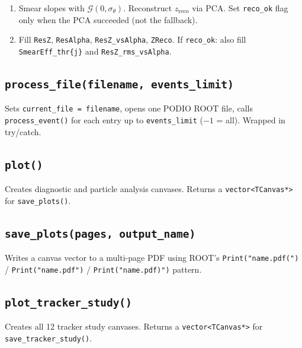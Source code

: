 \documentclass[11pt]{article}
\begin{document}
\begin{enumerate}
\begin{enumerate}
                Fill analytical histograms.
          \item Smear slopes with $\mathcal{G}(0, \sigma_\theta)$.
                Reconstruct $z_\text{reco}$ via PCA. Set \texttt{reco\_ok}
                flag only when the PCA succeeded (not the fallback).
          \item Fill \texttt{ResZ}, \texttt{ResAlpha}, \texttt{ResZ\_vsAlpha},
                \texttt{ZReco}. If \texttt{reco\_ok}: also fill
                \texttt{SmearEff\_thr\{j\}} and \texttt{ResZ\_rms\_vsAlpha}.
        \end{enumerate}
\end{enumerate}

\subsection{\texttt{process\_file(filename, events\_limit)}}

Sets \texttt{current\_file = filename}, opens one PODIO ROOT file,
calls \texttt{process\_event()} for each entry up to \texttt{events\_limit}
($-1$ = all). Wrapped in try/catch.

\subsection{\texttt{plot()}}

Creates diagnostic and particle analysis canvases. Returns a
\texttt{vector<TCanvas*>} for \texttt{save\_plots()}.

\subsection{\texttt{save\_plots(pages, output\_name)}}

Writes a canvas vector to a multi-page PDF using ROOT's
\texttt{Print("name.pdf(")} / \texttt{Print("name.pdf")} /
\texttt{Print("name.pdf)")} pattern.

\subsection{\texttt{plot\_tracker\_study()}}

Creates all 12 tracker study canvases. Returns a
\texttt{vector<TCanvas*>} for \texttt{save\_tracker\_study()}.
\end{document}
